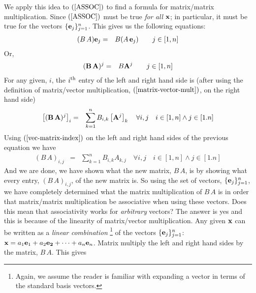 \documentclass{article}
\begin{document}
We apply this idea to $(\ref{ASSOC})$ to find a formula for matrix/matrix multiplication.
Since $(\ref{ASSOC})$ must be true {\em for all\/} ${\bf x}$; in particular, it must be
true for the vectors $\{{\bf e}_j\}_{j=1}^n$.
This gives us the following equations:
\begin{eqnarray}
	(B \, A) {\bf e}_j & = & B (A \, {\bf e}_j) \quad\quad \text{$j \in [1,n]$} 
\end{eqnarray}
Or,
\begin{eqnarray}
	({\bf B} \, {\bf A})^j & = & B  {\bf A}^j \quad\quad \text{$j \in [1, n]$}
\end{eqnarray}
For any given, $i$, the $i^{\rm th}$ entry of the left and right hand side is
(after using the definition of matrix/vector 
multiplication, $(\ref{matrix-vector-mult})$, on the right hand side)
\begin{eqnarray}
	\left[({\bf B} \, {\bf A})^j\right]_i & = & \sum_{k=1}^n B_{i,k}  \left[{\bf A}^j\right]_k  \quad \forall i,j \quad i \in [1, n] \wedge j \in [1.n]
\end{eqnarray}
Using $(\ref{vec-matrix-index})$ on the left and right hand sides of the previous equation we have
\begin{eqnarray}
	(B \, A)_{i, j} & = & \sum_{k=1}^n B_{i, k}  A_{k, j}  \quad \forall i,j \quad i \in [1, n] \wedge j \in [1.n] \label{matrix-matrix-mult}
\end{eqnarray}
And we are done, we have shown what the new matrix, $B \, A$, is by showing what every entry, $(B\, A)_{i, j}$, of
the new matrix is.
So using the set of vectors, $\{{\bf e}_j\}_{j=1}^n$, we have completely determined what 
the matrix multiplication of $B \, A$ is in order that matrix/matrix multiplication be 
associative when using these vectors. Does this mean that associativity works for 
{\em arbitrary\/} vectors? The answer is yes and this is because of the linearity of
matrix/vector multiplication. Any given ${\bf x}$ can be written as a {\em linear combination\/}%
\footnote{Again, we assume the reader is familiar with expanding a vector in terms of the standard basis vectors.}
of the vectors $\{{\bf e}_j\}_{j=1}^n$: ${\bf x} = a_1 {\bf e}_1 + a_2 {\bf e_2} + \cdots + a_n {\bf e}_n$.
Matrix multiply the left and right hand sides by the matrix, $B\,A$. This gives
\end{document}
